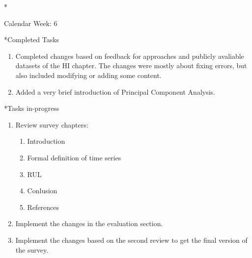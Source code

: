 \documentclass[11pt,a4paper]{article}
\begin{document}
\newpage
\begin{section}*{Calendar Week: 6  \hfill \date{12 February, 2021}}
 \begin{refsection}

       \begin{subsection}*{Completed Tasks}
             \begin{enumerate}
                   \item
                         Completed changes based on feedback for approaches and publicly avaliable datasets
                         of the HI chapter. The changes were mostly about fixing
                         errors, but also included modifying or adding some
                         content.
                   \item
                         Added a very brief introduction of Principal Component
                         Analysis.
             \end{enumerate}
       \end{subsection}

       \begin{subsection}*{Tasks in-progress}
             \begin{enumerate}
                   \item Review survey chapters:
                         \begin{enumerate}
                               \item Introduction
                               \item Formal definition of time series
                               \item RUL
                               \item Conlusion
                               \item References
                         \end{enumerate}
                   \item
                         Implement the changes in the evaluation section.
                   \item
                         Implement the changes based on the second review to
                         get the final version of the survey.
             \end{enumerate}
       \end{subsection}

 \end{refsection}
\end{section}
\end{document}
